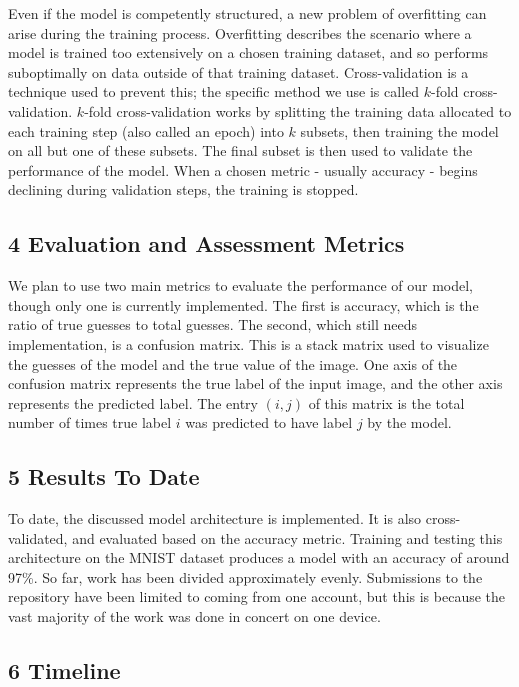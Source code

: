 \documentclass{article}
\begin{document}
Even if the model is competently structured, a new problem of overfitting can arise during the training process. Overfitting describes the scenario where a model is trained too extensively on a chosen training dataset, and so performs suboptimally on data outside of that training dataset. Cross-validation is a technique used to prevent this; the specific method we use is called $k$-fold cross-validation. $k$-fold cross-validation works by splitting the training data allocated to each training step (also called an epoch) into $k$ subsets, then training the model on all but one of these subsets. The final subset is then used to validate the performance of the model. When a chosen metric - usually accuracy - begins declining during validation steps, the training is stopped.

\subsection*{4 Evaluation and Assessment Metrics}
We plan to use two main metrics to evaluate the performance of our model, though only one is currently implemented. The first is accuracy, which is the ratio of true guesses to total guesses. The second, which still needs implementation, is a confusion matrix. This is a stack matrix used to visualize the guesses of the model and the true value of the image. One axis of the confusion matrix represents the true label of  the input image, and the other axis represents the predicted label. The entry $(i, j)$ of this matrix is the total number of times true label $i$ was predicted to have label $j$ by the model.

\subsection*{5 Results To Date}

To date, the discussed model architecture is implemented. It is also cross-validated, and evaluated based on the accuracy metric. Training and testing this architecture on the MNIST dataset produces a model with an accuracy of around 97\%. So far, work has been divided approximately evenly. Submissions to the repository have been limited to coming from one account, but this is because the vast majority of the work was done in concert on one device.

\subsection*{6 Timeline}
\end{document}
